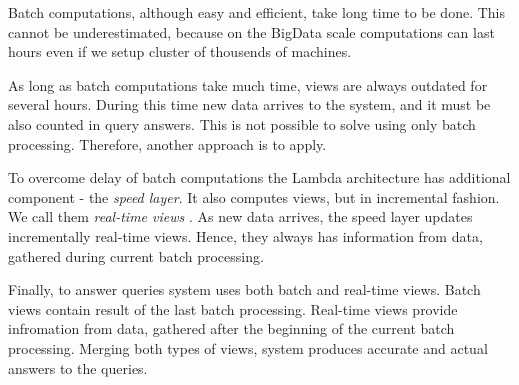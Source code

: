 Batch computations, although easy and efficient, take long time to be done.
This cannot be underestimated, because on the BigData scale computations can last hours even if we setup cluster of thousends of machines.

As long as batch computations take much time, views are always outdated for several hours.
During this time new data arrives to the system, and it must be also counted in query answers.
This is not possible to solve using only batch processing.
Therefore, another approach is to apply.

To overcome delay of batch computations the Lambda architecture has additional component - the \textit{speed layer}.
It also computes views, but in incremental fashion.
We call them \textit{real-time views} .
As new data arrives, the speed layer updates incrementally real-time views.
Hence, they always has information from data, gathered during current batch processing.

Finally, to answer queries system uses both batch and real-time views.
Batch views contain result of the last batch processing.
Real-time views provide infromation from data, gathered after the beginning of the current batch processing.
Merging both types of views, system produces accurate and actual answers to the queries.